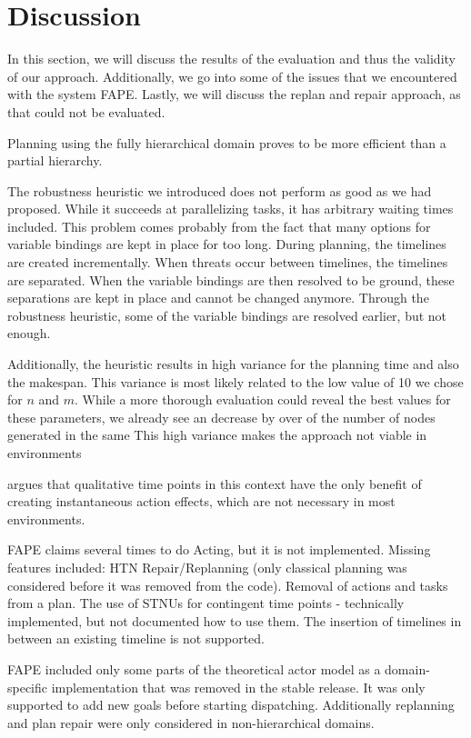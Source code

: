 \section{Discussion}\label{sec:discussion}

In this section, we will discuss the results of the evaluation and thus the validity of our approach.
Additionally, we go into some of the issues that we encountered with the system FAPE.
Lastly, we will discuss the replan and repair approach, as that could not be evaluated. 


Planning using the fully hierarchical domain proves to be more efficient than a partial hierarchy.


The robustness heuristic we introduced does not perform as good as we had proposed.
While it succeeds at parallelizing tasks, it has arbitrary waiting times included.
This problem comes probably from the fact that many options for variable bindings are kept in place for too long.
During planning, the timelines are created incrementally.
When threats occur between timelines, the timelines are separated.
When the variable bindings are then resolved to be ground, these separations are kept in place and cannot be changed anymore.
Through the robustness heuristic, some of the variable bindings are resolved earlier, but not enough.

Additionally, the heuristic results in high variance for the planning time and also the makespan.
This variance is most likely related to the low value of 10 we chose for $n$ and $m$.
While a more thorough evaluation could reveal the best values for these parameters, we already see an decrease by over  of the number of nodes generated in the same 
This high variance makes the approach not viable in environments 


\cite{bit-monnotTemporalHierarchicalModels2017} argues that qualitative time points in this context have the only benefit of creating instantaneous action effects, which are not necessary in most environments.

FAPE claims several times to do Acting, but it is not implemented.
Missing features included: 
HTN Repair/Replanning (only classical planning was considered before it was removed from the code). 
Removal of actions and tasks from a plan.
The use of STNUs for contingent time points - technically implemented, but not documented how to use them.
The insertion of timelines in between an existing timeline is not supported.


FAPE included only some parts of the theoretical actor model as a domain-specific implementation that was removed in the stable release.
It was only supported to add new goals before starting dispatching.
Additionally replanning and plan repair were only considered in non-hierarchical domains.


